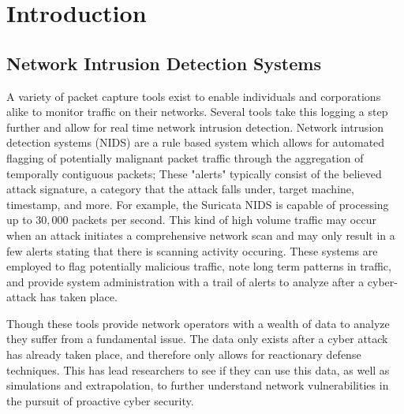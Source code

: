 \documentclass[12pt,american]{report}
\begin{document}


\afterpreface%

\printglossaries

\body%
\chapter{Introduction}

\section{Network Intrusion Detection Systems}
A variety of packet capture tools exist to enable individuals and corporations alike to monitor traffic on their networks. Several tools take this logging a step further and allow for real time network intrusion detection. Network intrusion detection systems (NIDS) are a rule based system which allows for automated flagging of potentially malignant packet traffic through the aggregation of temporally contiguous packets;  These "alerts" typically consist of the believed attack signature, a category that the attack falls under, target machine, timestamp, and more.   For example, the Suricata NIDS is capable of processing up to $30,000$ packets per second. This kind of high volume traffic may occur when an attack initiates a comprehensive network scan and may only result in a few alerts stating that there is scanning activity occuring. These systems are employed to flag potentially malicious traffic, note long term patterns in traffic, and provide system administration with a trail of alerts to analyze after a cyber-attack has taken place. 

Though these tools provide network operators with a wealth of data to analyze they suffer from a fundamental issue. The data only exists after a cyber attack has already taken place, and therefore only allows for reactionary defense techniques. This has lead researchers to see if they can use this data, as well as simulations and extrapolation, to further understand network vulnerabilities in the pursuit of proactive cyber security. 
\end{document}
